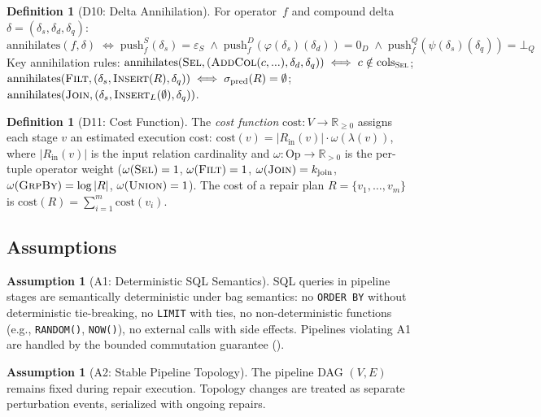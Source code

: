 \documentclass[11pt,a4paper]{article}
\theoremstyle{definition}
\newtheorem{definition}[theorem]{Definition}
\newtheorem{assumption}[theorem]{Assumption}
\newcommand{\epsS}{\varepsilon_S}
\newcommand{\zeroD}{0_D}
\newcommand{\botQ}{\bot_Q}
\newcommand{\push}{\mathrm{push}}
\newcommand{\ann}{\mathrm{annihilates}}
\newcommand{\cost}{\mathrm{cost}}
\newcommand{\Op}{\mathrm{Op}}
\begin{document}
\begin{definition}[D10: Delta Annihilation]\label{def:annihilation}
For operator~$f$ and compound delta $\delta = (\delta_s, \delta_d, \delta_q)$:
\[
\ann(f, \delta) \;\iff\;
  \push_f^S(\delta_s) = \epsS \;\wedge\;
  \push_f^D(\varphi(\delta_s)(\delta_d)) = \zeroD \;\wedge\;
  \push_f^Q(\psi(\delta_s)(\delta_q)) = \botQ
\]
Key annihilation rules:
$\ann(\textsc{Sel}, (\textsc{AddCol}(c,...), \delta_d, \delta_q))
\iff c \notin \mathrm{cols}_{\textsc{Sel}}$;
$\ann(\textsc{Filt}, (\delta_s, \textsc{Insert}(R), \delta_q))
\iff \sigma_{\mathrm{pred}}(R) = \emptyset$;
$\ann(\textsc{Join}, (\delta_s, \textsc{Insert}_L(\emptyset), \delta_q))$.
\end{definition}

\begin{definition}[D11: Cost Function]\label{def:cost-function}
The \emph{cost function} $\cost\colon V \to \mathbb{R}_{\geq 0}$ assigns each
stage $v$ an estimated execution cost:
$\cost(v) = |R_{\mathrm{in}}(v)| \cdot \omega(\lambda(v))$,
where $|R_{\mathrm{in}}(v)|$ is the input relation cardinality and
$\omega\colon \Op \to \mathbb{R}_{>0}$ is the per-tuple operator weight
($\omega(\textsc{Sel}) = 1$, $\omega(\textsc{Filt}) = 1$,
$\omega(\textsc{Join}) = k_{\mathrm{join}}$,
$\omega(\textsc{GrpBy}) = \log |R|$,
$\omega(\textsc{Union}) = 1$).
The cost of a repair plan $R = \{v_1, \ldots, v_m\}$ is
$\cost(R) = \sum_{i=1}^m \cost(v_i)$.
\end{definition}

\subsection{Assumptions}
\label{sec:assumptions}

\begin{assumption}[A1: Deterministic SQL Semantics]\label{asm:deterministic}
SQL queries in pipeline stages are semantically deterministic under bag
semantics: no \texttt{ORDER BY} without deterministic tie-breaking,
no \texttt{LIMIT} with ties, no non-deterministic functions
(e.g., \texttt{RANDOM()}, \texttt{NOW()}), no external calls with side effects.
Pipelines violating A1 are handled by the bounded commutation guarantee
().
\end{assumption}

\begin{assumption}[A2: Stable Pipeline Topology]\label{asm:stable-topology}
The pipeline DAG $(V, E)$ remains fixed during repair execution.
Topology changes are treated as separate perturbation events,
serialized with ongoing repairs.
\end{assumption}
\end{document}
